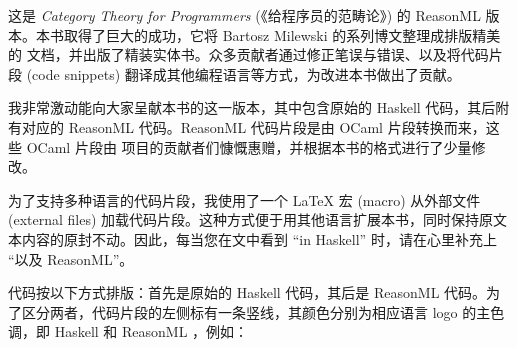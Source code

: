 
\lettrine[lhang=0.17]{这}{是} \emph{Category Theory for Programmers} (《给程序员的范畴论》) 的 ReasonML 版本。本书取得了巨大的成功，它将 Bartosz Milewski 的系列博文整理成排版精美的  文档，并出版了精装实体书。众多贡献者通过修正笔误与错误、以及将代码片段 (code snippets) 翻译成其他编程语言等方式，为改进本书做出了贡献。

我非常激动能向大家呈献本书的这一版本，其中包含原始的 Haskell 代码，其后附有对应的 ReasonML 代码。ReasonML 代码片段是由 OCaml 片段转换而来，这些 OCaml 片段由  项目的贡献者们慷慨惠赠，并根据本书的格式进行了少量修改。

为了支持多种语言的代码片段，我使用了一个 \LaTeX{} 宏 (macro) 从外部文件 (external files) 加载代码片段。这种方式便于用其他语言扩展本书，同时保持原文本内容的原封不动。因此，每当您在文中看到 “in Haskell” 时，请在心里补充上 “以及 ReasonML”。

代码按以下方式排版：首先是原始的 Haskell 代码，其后是 ReasonML 代码。为了区分两者，代码片段的左侧标有一条竖线，其颜色分别为相应语言 logo 的主色调，即 Haskell  和 ReasonML ，例如：

\unskip
{}
\NoIndentAfterThis